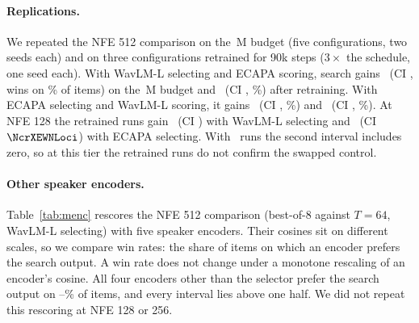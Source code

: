\paragraph{Replications.}
We repeated the NFE 512 comparison on the \NmaxNfour\,M budget (five configurations, two
seeds each) and on three configurations retrained for 90k steps ($3\times$ the schedule, one
seed each). With WavLM-L selecting and ECAPA scoring, search gains \NscopeDd\ (CI \NscopeDci,
wins on \NscopeDwin\% of items) on the \NmaxNfour\,M budget and \NscopeNd\ (CI \NscopeNci,
\NscopeNwin\%) after retraining. With ECAPA selecting and WavLM-L scoring, it gains
\NcrXEWDd\ (CI \NcrXEWDci, \NcrXEWDwin\%) and \NcrXEWNd\ (CI \NcrXEWNci, \NcrXEWNwin\%). At
NFE 128 the retrained runs gain \NcrXWENLod\ (CI \NcrXWENLoci) with WavLM-L selecting and
\NcrXEWNLod\ (CI $\NcrXEWNLoci$) with ECAPA selecting. With \NcrXNRuns\ runs the second
interval includes zero, so at this tier the retrained runs do not confirm the swapped
control.

\paragraph{Other speaker encoders.}
Table~\ref{tab:menc} rescores the NFE 512 comparison (best-of-8 against $T{=}64$, WavLM-L
selecting) with five speaker encoders. Their cosines sit on different scales, so we compare
win rates: the share of items on which an encoder prefers the search output. A win rate does
not change under a monotone rescaling of an encoder's cosine. All four
encoders other than the selector prefer the search output on \NmencLo--\NmencHi\% of items,
and every interval lies above one half. We did not repeat this rescoring at NFE 128 or 256.

\begin{table}[h]
  \centering\small
  \caption{Search against refinement at NFE 512 (\NmencRuns\ runs, \NmencItems\ items each),
  rescored by ECAPA \citep{ecapa,speechbrain}, x-vector \citep{xvector} (both trained on VoxCeleb
  \citep{voxceleb1,voxceleb2}), GE2E \citep{ge2e}, WavLM-base+ and WavLM-L \citep{wavlm,seedtts}.}
  \label{tab:menc}
  
\end{table}
